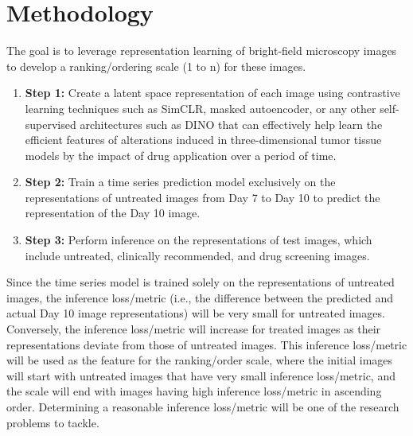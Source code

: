 \chapter{Methodology}\label{ch: Methodology}
The goal is to leverage representation learning of bright-field microscopy images to develop a ranking/ordering scale (1 to n) for these images. 

\begin{enumerate}
  \item \textbf{Step 1:} Create a latent space representation of each image using contrastive learning techniques such as SimCLR, masked autoencoder, or any other self-supervised architectures such as DINO that can effectively help learn the efficient features of alterations induced in three-dimensional tumor tissue models by the impact of drug application over a period of time.
  
  \item \textbf{Step 2:} Train a time series prediction model exclusively on the representations of untreated images from Day 7 to Day 10 to predict the representation of the Day 10 image.
  
  \item \textbf{Step 3:} Perform inference on the representations of test images, which include untreated, clinically recommended, and drug screening images.
\end{enumerate}

Since the time series model is trained solely on the representations of untreated images, the inference loss/metric (i.e., the difference between the predicted and actual Day 10 image representations) will be very small for untreated images. Conversely, the inference loss/metric will increase for treated images as their representations deviate from those of untreated images. This inference loss/metric will be used as the feature for the ranking/order scale, where the initial images will start with untreated images that have very small inference loss/metric, and the scale will end with images having high inference loss/metric in ascending order. Determining a reasonable inference loss/metric will be one of the research problems to tackle.

